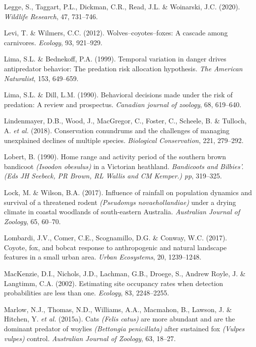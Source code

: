 \documentclass[11pt,a4paper,titlepage,twoside,openright]{style/unimelbthesis}
\begin{document}
\begin{mainmatter}
\leavevmode\hypertarget{ref-legge2020cat}{}%
Legge, S., Taggart, P.L., Dickman, C.R., Read, J.L. \& Woinarski, J.C. (2020). \emph{Wildlife Research}, 47, 731--746.

\leavevmode\hypertarget{ref-levi2012wolves}{}%
Levi, T. \& Wilmers, C.C. (2012). Wolves--coyotes--foxes: A cascade among carnivores. \emph{Ecology}, 93, 921--929.

\leavevmode\hypertarget{ref-lima1999temporal}{}%
Lima, S.L. \& Bednekoff, P.A. (1999). Temporal variation in danger drives antipredator behavior: The predation risk allocation hypothesis. \emph{The American Naturalist}, 153, 649--659.

\leavevmode\hypertarget{ref-lima1990behavioral}{}%
Lima, S.L. \& Dill, L.M. (1990). Behavioral decisions made under the risk of predation: A review and prospectus. \emph{Canadian journal of zoology}, 68, 619--640.

\leavevmode\hypertarget{ref-lindenmayer2018conservation}{}%
Lindenmayer, D.B., Wood, J., MacGregor, C., Foster, C., Scheele, B. \& Tulloch, A. \emph{et al.} (2018). Conservation conundrums and the challenges of managing unexplained declines of multiple species. \emph{Biological Conservation}, 221, 279--292.

\leavevmode\hypertarget{ref-lobert1990home}{}%
Lobert, B. (1990). Home range and activity period of the southern brown bandicoot \emph{(Isoodon obesulus)} in a Victorian heathland. \emph{Bandicoots and Bilbies'.(Eds JH Seebeck, PR Brown, RL Wallis and CM Kemper.) pp}, 319--325.

\leavevmode\hypertarget{ref-lock2017influence}{}%
Lock, M. \& Wilson, B.A. (2017). Influence of rainfall on population dynamics and survival of a threatened rodent \emph{(Pseudomys novaehollandiae)} under a drying climate in coastal woodlands of south-eastern Australia. \emph{Australian Journal of Zoology}, 65, 60--70.

\leavevmode\hypertarget{ref-lombardi2017coyote}{}%
Lombardi, J.V., Comer, C.E., Scognamillo, D.G. \& Conway, W.C. (2017). Coyote, fox, and bobcat response to anthropogenic and natural landscape features in a small urban area. \emph{Urban Ecosystems}, 20, 1239--1248.

\leavevmode\hypertarget{ref-mackenzie2002estimating}{}%
MacKenzie, D.I., Nichols, J.D., Lachman, G.B., Droege, S., Andrew Royle, J. \& Langtimm, C.A. (2002). Estimating site occupancy rates when detection probabilities are less than one. \emph{Ecology}, 83, 2248--2255.

\leavevmode\hypertarget{ref-marlow2015cats}{}%
Marlow, N.J., Thomas, N.D., Williams, A.A., Macmahon, B., Lawson, J. \& Hitchen, Y. \emph{et al.} (2015a). Cats \emph{(Felis catus)} are more abundant and are the dominant predator of woylies \emph{(Bettongia penicillata)} after sustained fox \emph{(Vulpes vulpes)} control. \emph{Australian Journal of Zoology}, 63, 18--27.


\end{mainmatter}
\end{document}
